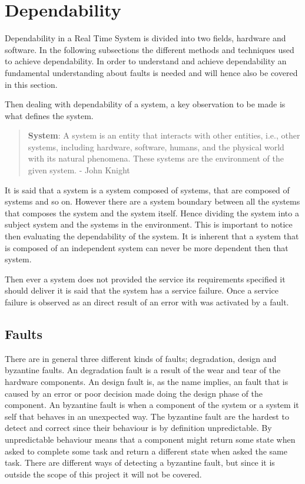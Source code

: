 \section{Dependability}
Dependability in a Real Time System is divided into two fields, hardware and software. 
In the following subsections the different methods and techniques used to achieve dependability.  
In order to understand and achieve dependability an fundamental understanding about faults is needed and will hence also be covered in this section.

Then dealing with dependability of a system, a key observation to be made is what defines the system. 
\begin{quote}
\textbf{System}: A system is an entity that interacts with other entities, i.e., other systems, including hardware, software, humans, and the physical world with its natural phenomena.
These systems are the environment of the given system. 
- John Knight \cite{FundementalsOfDependableComputingForSoftwareEngineers}
\end{quote}
It is said that a system is a system composed of systems, that are composed of systems and so on. 
However there are a system boundary between all the systems that composes the system and the system itself. 
Hence dividing the system into a subject system and the systems in the environment. 
This is important to notice then evaluating the dependability of the system. 
It is inherent that a system that is composed of an independent system can never be more dependent then that system. 

Then ever a system does not provided the service its requirements specified it should deliver it is said that the system has a service failure. 
Once a service failure is observed as an direct result of an error with was activated by a fault. 

\subsection{Faults}
There are in general three different kinds of faults; degradation, design and byzantine faults. 
An degradation fault is a result of the wear and tear of the hardware components.
An design fault is, as the name implies, an fault that is caused by an error or poor decision made doing the design phase of the component. 
An byzantine fault is when a component of the system or a system it self that behaves in an unexpected way. 
The byzantine fault are the hardest to detect and correct since their behaviour is by definition unpredictable. 
By unpredictable behaviour means that a component might return some state when asked to complete some task and return a different state when asked the same task. 
There are different ways of detecting a byzantine fault, but since it is outside the scope of this project it will not be covered. 

